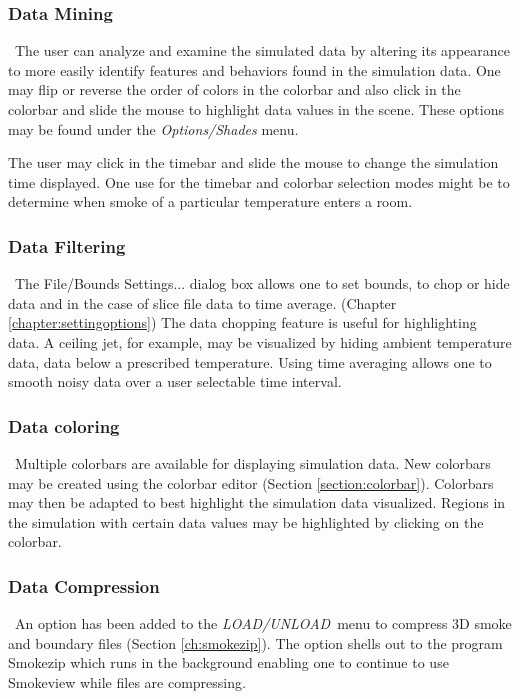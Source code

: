\documentclass[11pt,twoside]{book}
\begin{document}
\subsubsection{Data Mining}\ The user can analyze and examine the simulated
data by altering its appearance to more easily identify features
and behaviors found in the simulation data. One may flip or
reverse the order of colors in the colorbar and also click in the
colorbar and slide the mouse to highlight data values in the
scene. These options may be found under the {\em Options/Shades}
menu.

The user may click in the timebar and slide the mouse to
change the simulation time displayed. One use for the timebar and colorbar selection modes might be to determine
when smoke of a particular temperature enters a room.

\subsubsection{Data Filtering}\ The File/Bounds Settings...
dialog box allows one to set bounds, to chop or hide data and in the case
of slice file data to time average. (Chapter \ref{chapter:settingoptions})
The data chopping
feature is useful for highlighting data.  A ceiling jet, for example,
may be visualized by hiding ambient temperature
data,  data below a prescribed temperature.
Using time averaging allows one to smooth noisy data over a user selectable time
interval.

\subsubsection{Data coloring}\ Multiple colorbars are available for displaying simulation data.
New colorbars may be created using the colorbar editor (Section \ref{section:colorbar}).
Colorbars may then be adapted to best highlight the simulation data visualized.
Regions in the simulation with certain data values may be highlighted by clicking
on the colorbar.

\subsubsection{Data Compression}\ An option has been added to the
{\em LOAD/UNLOAD}\ menu to compress 3D smoke and boundary
files (Section \ref{ch:smokezip}). The option shells out to the program Smokezip which runs in
the background enabling one to continue to use Smokeview while
files are compressing.
\end{document}
